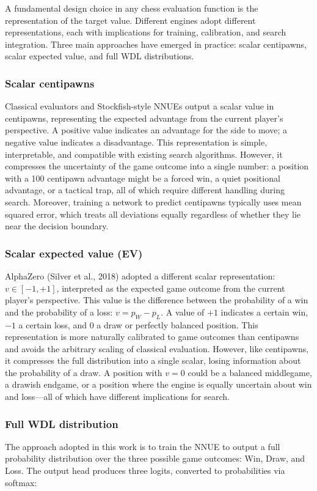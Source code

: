 A fundamental design choice in any chess evaluation function is the representation of the target value. Different engines adopt different representations, each with implications for training, calibration, and search integration. Three main approaches have emerged in practice: scalar centipawns, scalar expected value, and full WDL distributions.

\subsubsection{Scalar centipawns}
Classical evaluators and Stockfish-style NNUEs output a scalar value in centipawns, representing the expected advantage from the current player's perspective. A positive value indicates an advantage for the side to move; a negative value indicates a disadvantage. This representation is simple, interpretable, and compatible with existing search algorithms. However, it compresses the uncertainty of the game outcome into a single number: a position with a 100 centipawn advantage might be a forced win, a quiet positional advantage, or a tactical trap, all of which require different handling during search. Moreover, training a network to predict centipawns typically uses mean squared error, which treats all deviations equally regardless of whether they lie near the decision boundary.


\subsubsection{Scalar expected value (EV)}
AlphaZero (Silver et al., 2018) adopted a different scalar representation: $v \in [-1, +1]$, interpreted as the expected game outcome from the current player's perspective. This value is the difference between the probability of a win and the probability of a loss: $v = p_W - p_L$. A value of $+1$ indicates a certain win, $-1$ a certain loss, and $0$ a draw or perfectly balanced position. This representation is more naturally calibrated to game outcomes than centipawns and avoids the arbitrary scaling of classical evaluation. However, like centipawns, it compresses the full distribution into a single scalar, losing information about the probability of a draw. A position with $v = 0$ could be a balanced middlegame, a drawish endgame, or a position where the engine is equally uncertain about win and loss---all of which have different implications for search.

\subsubsection{Full WDL distribution}
The approach adopted in this work is to train the NNUE to output a full probability distribution over the three possible game outcomes: Win, Draw, and Loss. The output head produces three logits, converted to probabilities via softmax:

